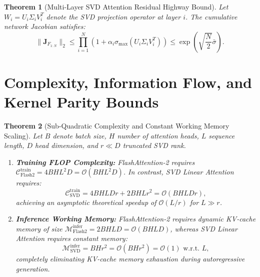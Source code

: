 \documentclass[journal]{IEEEtran}
\newtheorem{theorem}{Theorem}
\begin{document}
\begin{theorem}[Multi-Layer SVD Attention Residual Highway Bound]
Let $W_i = U_i \Sigma_i V_i^T$ denote the SVD projection operator at layer $i$. The cumulative network Jacobian satisfies:
\begin{equation}
\|\mathbf{J}_{F_{1:N}}\|_2 \le \prod_{i=1}^N \left( 1 + \alpha_i \sigma_{\max}(U_i \Sigma_i V_i^T) \right) \le \exp\left( \sqrt{\frac{N}{2}} \bar{\sigma} \right).
\end{equation}
\end{theorem}

\section{Complexity, Information Flow, and Kernel Parity Bounds}

\begin{theorem}[Sub-Quadratic Complexity and Constant Working Memory Scaling]
Let $B$ denote batch size, $H$ number of attention heads, $L$ sequence length, $D$ head dimension, and $r \ll D$ truncated SVD rank.
\begin{enumerate}
    \item \textbf{Training FLOP Complexity:} FlashAttention-2 requires $\mathcal{C}_{\text{Flash2}}^{\text{train}} = 4 B H L^2 D = \mathcal{O}(B H L^2 D)$. In contrast, SVD Linear Attention requires:
    \begin{equation}
    \mathcal{C}_{\text{SVD}}^{\text{train}} = 4 B H L D r + 2 B H L r^2 = \mathcal{O}(B H L D r),
    \end{equation}
    achieving an asymptotic theoretical speedup of $\mathcal{O}(L / r)$ for $L \gg r$.
    \item \textbf{Inference Working Memory:} FlashAttention-2 requires dynamic KV-cache memory of size $\mathcal{M}_{\text{Flash2}}^{\text{infer}} = 2 B H L D = \mathcal{O}(B H L D)$, whereas SVD Linear Attention requires constant memory:
    \begin{equation}
    \mathcal{M}_{\text{SVD}}^{\text{infer}} = B H r^2 = \mathcal{O}(B H r^2) = \mathcal{O}(1) \text{ w.r.t. } L,
    \end{equation}
    completely eliminating KV-cache memory exhaustion during autoregressive generation.
\end{enumerate}
\end{theorem}
\end{document}
